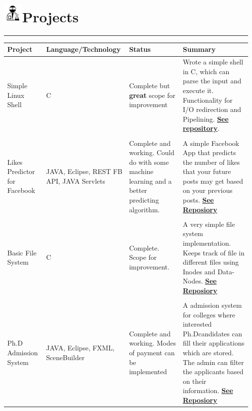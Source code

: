 \documentclass{article}
\begin{document}
	\section*{\includegraphics[width=1cm]{buttons/scientist.png}Projects}
		\textcolor[RGB]{220,220,220}{\rule{\linewidth}{0.3pt}}
		\begin{center}
		    \begin{tabular}{ | p{3cm}  p{4cm} p{4cm} p{7cm} |}
		    \hline
		    \textbf{Project} & \textbf{Language/Technology} & \textbf{Status} & \textbf{Summary} \\ 
		    \hline
		  	Simple Linux Shell & C  & Complete  but \textbf{great} scope for improvement & Wrote a simple shell in C, which can parse the input and execute it. Functionality for I/O redirection and Pipelining. \href{https://bitbucket.org/burhan_nabi/linux-shell}{\textbf{See repository}}.\\ %
		  	\hline 
			&&&\\		
			Likes Predictor for Facebook& JAVA, Eclipse, REST FB API, JAVA Servlets & Complete and working. Could do with some machine learning and a better predicting algorithm.  & A simple Facebook App that predicts the number of likes that your future posts may get based on your previous posts. \href{https://bitbucket.org/burhan_nabi/likes-predictor/}{\textbf{See Reposiory}}\\ 
			\hline 
			&&&\\
		   	Basic File System & C & Complete. Scope for improvement.  & A very simple file system implementation. Keeps track of file in different files using Inodes and Data-Nodes. \href{https://github.com/BurhanNabi/file-system-pushyBoy}{\textbf{See Reposiory}}\\ 
			\hline 
			&&&\\		
			Ph.D Admission System & JAVA, Eclipse, FXML, SceneBuilder & Complete and working. Modes of payment can be implemented  & A admission system for colleges where interested Ph.Dcandidates can fill their applications which are stored. The admin can filter the applicants based on their information. \href{https://github.com/BurhanNabi/mad-admissions}{\textbf{See Reposiory}}\\ 

\end{tabular}
\end{center}
\end{document}
